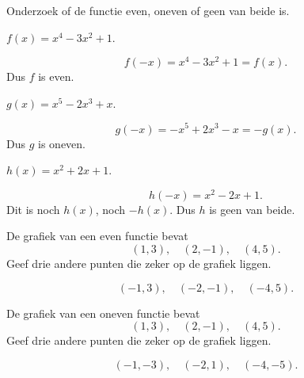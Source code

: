 \documentclass{ximera}
\begin{document}
\begin{oefening}{\oefB\ESS}

Onderzoek of de functie even, oneven of geen van beide is.

\begin{question}
\(
f(x)=x^4-3x^2+1.
\)
\begin{oplossing}
\[
f(-x)=x^4-3x^2+1=f(x).
\]
Dus \(f\) is even.
\end{oplossing}
\end{question}

\begin{question}
\(
g(x)=x^5-2x^3+x.
\)
\begin{oplossing}
\[
g(-x)=-x^5+2x^3-x=-g(x).
\]
Dus \(g\) is oneven.
\end{oplossing}
\end{question}

\begin{question}
\(
h(x)=x^2+2x+1.
\)
\begin{oplossing}
\[
h(-x)=x^2-2x+1.
\]
Dit is noch \(h(x)\), noch \(-h(x)\). Dus \(h\) is geen van beide.
\end{oplossing}
\end{question}

\end{oefening}

\begin{oefening}{\oefB\ESS}

\begin{question}
De grafiek van een even functie bevat
\[
(1,3),\quad(2,-1),\quad(4,5).
\]
Geef drie andere punten die zeker op de grafiek liggen.
\begin{oplossing}
\[
(-1,3),\quad(-2,-1),\quad(-4,5).
\]
\end{oplossing}
\end{question}

\begin{question}
De grafiek van een oneven functie bevat
\[
(1,3),\quad(2,-1),\quad(4,5).
\]
Geef drie andere punten die zeker op de grafiek liggen.
\begin{oplossing}
\[
(-1,-3),\quad(-2,1),\quad(-4,-5).
\]
\end{oplossing}
\end{question}

\end{oefening}
\end{document}
